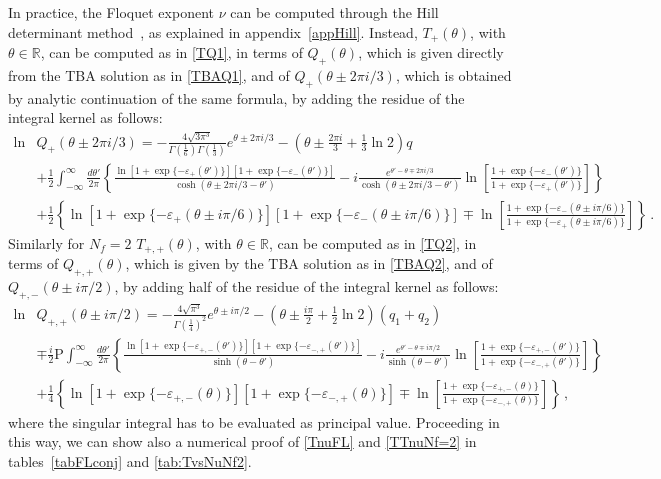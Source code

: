 \documentclass[11pt,a4paper]{elsarticle}
\def \th {\theta}
\def \ba {\begin{aligned}}
\def \ea {\end{aligned}}
\newcommand{\be}{\begin{equation}}
\newcommand{\ee}{\end{equation}}
\def\th{\theta}
\numberwithin{figure}{section}
\numberwithin{table}{section}
\begin{document}
In practice, the Floquet exponent $\nu$ can be
computed through the Hill determinant method~\cite{whittaker_watson_1996}, as explained in appendix~\ref{appHill}. Instead, $T_+(\theta)$, with $\theta \in \mathbb R$, can be computed as in \eqref{TQ1}, %
in terms of $Q_+(\theta)$, which is given directly from the TBA solution as in \eqref{TBAQ1}, and of $Q_+(\theta \pm 2 \pi i/3)$, which is obtained by analytic continuation of the same formula, by adding the residue of the integral kernel as follows:
\be
\ba \label{TBAQCont1}
 \ln &Q_+(\theta \pm 2 \pi i/3) 
 = -\frac{4   \sqrt{3\pi^{3}}}{\Gamma \left(\frac{1}{6}\right) \Gamma \left(\frac{1}{3}\right)} e^{\th\pm 2 \pi i/3}-( \th \pm \frac{2 \pi i}{3}+ \frac{1}{3} \ln 2) q \\
&+\frac{1}{2} \int_{-\infty}^\infty \frac{d\th'}{2\pi}\left \{ \frac{\ln[1+\exp \{-\varepsilon_+(\th')   \} ][1+\exp \{-\varepsilon_-(\th')  \} ]}{\cosh(\th\pm 2 \pi i/3-\th')}- i \frac{e^{\th'-\th\mp 2 \pi i/3}}{\cosh(\th\pm 2 \pi i/3-\th')} \ln\left[\frac{1+\exp \{-\varepsilon_-(\th')  \} }{1+\exp \{-\varepsilon_+(\th') \} }\right]\right \} \\
&+\frac{1}{2} \left\{\ln[1+\exp \{-\varepsilon_+(\th\pm i \pi/6)   \} ][1+\exp \{-\varepsilon_-(\th\pm i \pi/6)  \} ]\mp\ln\left[\frac{1+\exp \{-\varepsilon_-(\th\pm i \pi/6)  \} }{1+\exp \{-\varepsilon_+(\th\pm i \pi/6) \} }\right] \right\}\,.
\ea
\ee
Similarly for $N_f=2$ $T_{+,+}(\theta)$, with $\theta \in \mathbb R$, can be computed as in \eqref{TQ2}, %
in terms of $Q_{+,+}(\theta)$, which is given by the TBA solution as in \eqref{TBAQ2}, and of $Q_{+,-}(\theta \pm i \pi /2)$, by adding half of the residue of the integral kernel as follows:
\be
\ba \label{TBAQCont2}
 \ln &Q_{+,+}(\theta \pm i \pi/2) 
 = -\frac{4   \sqrt{\pi^{3}}}{\Gamma \left(\frac{1}{4}\right)^2 } e^{\th\pm i \pi/2}-( \th \pm \frac{i \pi}{2}+ \frac{1}{2} \ln 2) (q_1+q_2) \\
&\mp\frac{i}{2} \mathrm{P}\int_{-\infty}^\infty \frac{d\th'}{2\pi}\left \{ \frac{\ln[1+\exp \{-\varepsilon_{+,-}(\th')   \} ][1+\exp \{-\varepsilon_{-,+}(\th')  \} ]}{\sinh(\th-\th')}- i \frac{e^{\th'-\th\mp i\pi/2}}{\sinh(\th-\th')} \ln\left[\frac{1+\exp \{-\varepsilon_{+,-}(\th')  \} }{1+\exp \{-\varepsilon_{-,+}(\th') \} }\right]\right \} \\
&+\frac{1}{4} \left\{\ln[1+\exp \{-\varepsilon_{+,-}(\th )   \} ][1+\exp \{-\varepsilon_{-,+}(\th )  \} ]\mp\ln\left[\frac{1+\exp \{-\varepsilon_{+,-}(\th )  \} }{1+\exp \{-\varepsilon_{-,+}(\th ) \} }\right] \right\}\,,
\ea
\ee
where the singular integral has to be evaluated as principal value. 
Proceeding in this way, we can show also a numerical proof of \eqref{TnuFL} and \eqref{TTnuNf=2} in tables~\ref{tabFLconj} and \ref{tab:TvsNuNf2}.
\end{document}
